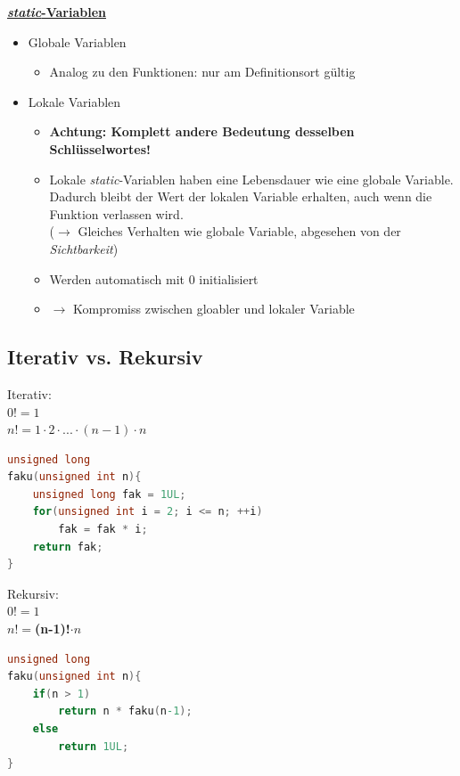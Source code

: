 		\underline{\textbf{\textit{static}-Variablen}}
			\begin{itemize}
				\item Globale Variablen
				\begin{itemize}
					\item Analog zu den Funktionen: nur am Definitionsort gültig
				\end{itemize}
				\item Lokale Variablen
				\begin{itemize}
					\item \textbf{Achtung: Komplett andere Bedeutung desselben Schlüsselwortes!}
					\item Lokale \textit{static}-Variablen haben eine Lebensdauer wie eine globale Variable. Dadurch bleibt der Wert der lokalen Variable erhalten, auch wenn die Funktion verlassen wird.\\
					($\rightarrow$ Gleiches Verhalten wie globale Variable, abgesehen von der \textit{Sichtbarkeit})
					\item Werden automatisch mit 0 initialisiert
					\item $\rightarrow$ Kompromiss zwischen gloabler und lokaler Variable
				\end{itemize}
			\end{itemize}

	\subsection{Iterativ vs. Rekursiv}
		\begin{minipage}{0.49\linewidth}
			Iterativ:\\
			$0! = 1$ \\
			$n! = 1 \cdot 2 \cdot ... \cdot (n-1) \cdot n$
			\begin{lstlisting}[language=C]
unsigned long
faku(unsigned int n){
	unsigned long fak = 1UL;
	for(unsigned int i = 2; i <= n; ++i)
		fak = fak * i;
	return fak;
}
			\end{lstlisting}
		\end{minipage}
		\hfill
		\begin{minipage}{0.49\linewidth}
			Rekursiv:\\
			$0! = 1$ \\
			$n! = $\textbf{(n-1)!}$ \cdot n$
			\begin{lstlisting}[language=C]
unsigned long
faku(unsigned int n){
	if(n > 1)
		return n * faku(n-1);
	else
		return 1UL;
}
				\end{lstlisting}
		\end{minipage}


